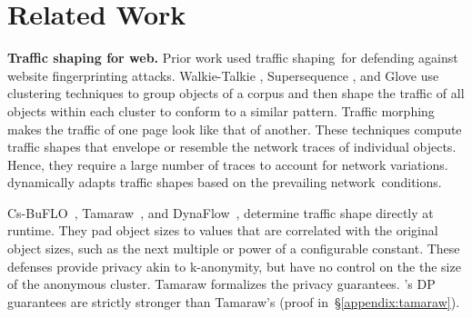 \vspace{-0.1cm}
\section{Related Work}
\label{sec:related}


\textbf{Traffic shaping for web.}
Prior work used traffic shaping~for defending against website
fingerprinting attacks.
%
Walkie-Talkie \cite{wang2017walkietalkie}, Supersequence
\noindent \cite{wang2014supersequence}, and Glove \cite{nithyanand2014glove} use
clustering techniques to group objects of a corpus and then shape the
traffic of all objects within each cluster to conform to a similar pattern.
Traffic morphing \cite{wright2009morphing} makes the traffic of one page look
like that of another.
These techniques compute traffic shapes that envelope or resemble the network
traces of individual objects. Hence, they require a large number of
traces to account for network variations.
{\sys} dynamically adapts traffic shapes based on the
prevailing network~conditions.

Cs-BuFLO~\cite{cai2014csbuflo}, Tamaraw~\cite{cai2014tamaraw}, and
DynaFlow~\cite{lu2018dynaflow}, determine traffic shape directly at runtime.
They pad object sizes to values that are correlated
with the original object sizes, such as the next
multiple or power of a configurable constant.
These defenses provide privacy akin to k-anonymity, but have no control on the
the size of the anonymous cluster.
Tamaraw\cite{cai2014tamaraw} formalizes the privacy guarantees.
{\sys}'s DP guarantees are strictly stronger than Tamaraw's (proof
in~\S\ref{appendix:tamaraw}).
%

